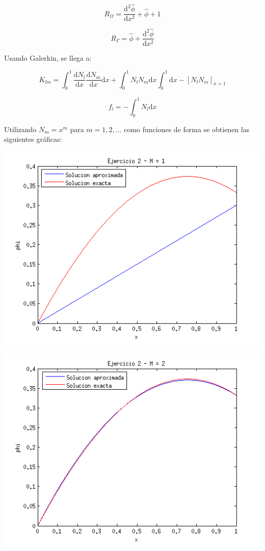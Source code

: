 \documentclass{article}
\begin{document}
\begin{enumerate}[1)]
{        \[ R_\Omega = \frac{\mbox{d}^2\hat{\phi}}{\mbox{d}x^2} +
                      \hat{\phi} + 1 \]

        \[ R_\Gamma = \hat{\phi} + \frac{\mbox{d}^2\hat{\phi}}{\mbox{d}x^2} \]

        Usando Galerkin, se llega a:

        \[ K_{lm} = \int_0^1{\frac{\mbox{d}N_l}{\mbox{d}x} \frac{\mbox{d}N_m}{\mbox{d}x} \mbox{d}x} + 
                    \int_0^1{N_l N_m \mbox{d}x}
                    \int_0^1{\mbox{d}x} - [N_l N_m]_{x=1} \]

        \[ f_l = -\int_0^1{N_l \mbox{d}x} \]

        Utilizando $N_m = x^m$ para $m = 1, 2, \ldots$ como funciones de forma se obtienen las 
        siguientes gráficas:

        \includegraphics[width=\textwidth]{ej2_M_1.png}

        \includegraphics[width=\textwidth]{ej2_M_2.png}
    }
\end{enumerate}
\end{document}
